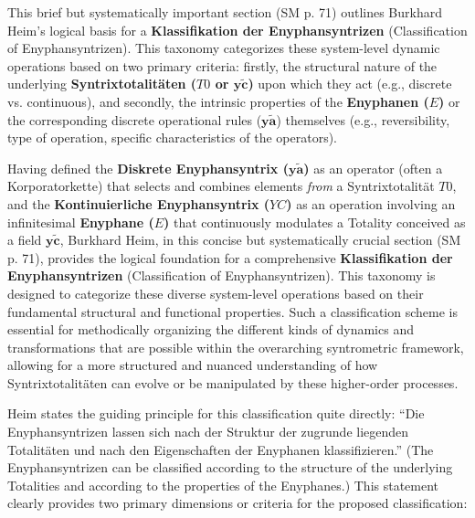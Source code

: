 \documentclass[12pt]{article}
\newcommand{\q}[1]{\enquote{#1}}
\newcommand{\syntrixtotalitaet}{T0}
\newcommand{\diskreteEnyphansyntrix}{\bm{y\widetilde{a}}}
\newcommand{\kontinuierlicheEnyphansyntrix}{YC}
\newcommand{\enyphane}{E}
\begin{document}
This brief but systematically important section (SM p. 71) outlines Burkhard Heim's logical basis for a \textbf{Klassifikation der Enyphansyntrizen} (Classification of Enyphansyntrizen). This taxonomy categorizes these system-level dynamic operations based on two primary criteria: firstly, the structural nature of the underlying \textbf{Syntrixtotalitäten (\(\syntrixtotalitaet\) or \(\mathbf{y\widetilde{c}}\))} upon which they act (e.g., discrete vs. continuous), and secondly, the intrinsic properties of the \textbf{Enyphanen (\(\enyphane\))} or the corresponding discrete operational rules (\(\diskreteEnyphansyntrix\)) themselves (e.g., reversibility, type of operation, specific characteristics of the operators).

Having defined the \textbf{Diskrete Enyphansyntrix (\( \diskreteEnyphansyntrix \))} as an operator (often a Korporatorkette) that selects and combines elements \textit{from} a Syntrixtotalität \( \syntrixtotalitaet \), and the \textbf{Kontinuierliche Enyphansyntrix (\( \kontinuierlicheEnyphansyntrix \))} as an operation involving an infinitesimal \textbf{Enyphane (\( \enyphane \))} that continuously modulates a Totality conceived as a field \( \mathbf{y\widetilde{c}} \), Burkhard Heim, in this concise but systematically crucial section (SM p. 71), provides the logical foundation for a comprehensive \textbf{Klassifikation der Enyphansyntrizen} (Classification of Enyphansyntrizen). This taxonomy is designed to categorize these diverse system-level operations based on their fundamental structural and functional properties. Such a classification scheme is essential for methodically organizing the different kinds of dynamics and transformations that are possible within the overarching syntrometric framework, allowing for a more structured and nuanced understanding of how Syntrixtotalitäten can evolve or be manipulated by these higher-order processes.

Heim states the guiding principle for this classification quite directly: \q{Die Enyphansyntrizen lassen sich nach der Struktur der zugrunde liegenden Totalitäten und nach den Eigenschaften der Enyphanen klassifizieren.} (The Enyphansyntrizen can be classified according to the structure of the underlying Totalities and according to the properties of the Enyphanes.) This statement clearly provides two primary dimensions or criteria for the proposed classification:
\end{document}
